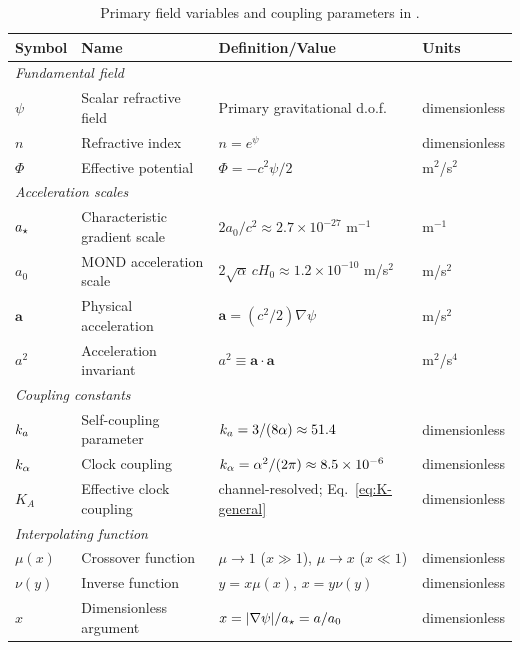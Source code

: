\begin{table}[t]
\centering
\caption{Primary field variables and coupling parameters in \DFD.}
\label{tab:fields}
\begin{tabular}{llll}
\toprule
\textbf{Symbol} & \textbf{Name} & \textbf{Definition/Value} & \textbf{Units} \\
\midrule
\multicolumn{4}{l}{\textit{Fundamental field}} \\
$\psi$ & Scalar refractive field & Primary gravitational d.o.f. & dimensionless \\
$n$ & Refractive index & $n = e^\psi$ & dimensionless \\
$\Phi$ & Effective potential & $\Phi = -c^2\psi/2$ & m$^2$/s$^2$ \\
\midrule
\multicolumn{4}{l}{\textit{Acceleration scales}} \\
$a_\star$ & Characteristic gradient scale & $2a_0/c^2 \approx 2.7 \times 10^{-27}$ m$^{-1}$ & m$^{-1}$ \\
$a_0$ & MOND acceleration scale & $2\sqrt{\alpha}\,cH_0 \approx 1.2 \times 10^{-10}$ m/s$^2$ & m/s$^2$ \\
$\mathbf{a}$ & Physical acceleration & $\mathbf{a} = (c^2/2)\nabla\psi$ & m/s$^2$ \\
$a^2$ & Acceleration invariant & $a^2 \equiv \mathbf{a}\cdot\mathbf{a}$ & m$^2$/s$^4$ \\
\midrule
\multicolumn{4}{l}{\textit{Coupling constants}} \\
$k_a$ & Self-coupling parameter & $k_a = 3/(8\alpha) \approx 51.4$ & dimensionless \\
$k_\alpha$ & Clock coupling & $k_\alpha = \alpha^2/(2\pi) \approx 8.5\times 10^{-6}$ & dimensionless \\
$K_A$ & Effective clock coupling & channel-resolved; Eq.~\eqref{eq:K-general} & dimensionless \\
\midrule
\multicolumn{4}{l}{\textit{Interpolating function}} \\
$\mu(x)$ & Crossover function & $\mu \to 1$ ($x \gg 1$), $\mu \to x$ ($x \ll 1$) & dimensionless \\
$\nu(y)$ & Inverse function & $y = x\mu(x)$, $x = y\nu(y)$ & dimensionless \\
$x$ & Dimensionless argument & $x = |\nabla\psi|/a_\star = a/a_0$ & dimensionless \\
\bottomrule
\end{tabular}
\end{table}

